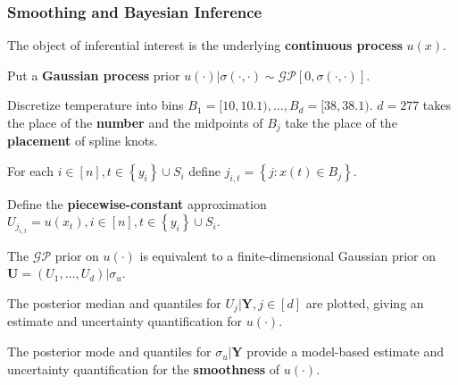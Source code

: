 \documentclass[10pt,usenames,dvipsnames,t]{beamer}
\newcommand{\GP}{\mathcal{GP}}
\newcommand{\bracevec}[1]{\left\lbrace #1 \right\rbrace}
\newcommand{\mb}[1]{\boldsymbol{#1}}
\begin{document}
\begin{frame}
\frametitle{Smoothing and Bayesian Inference \citep{stringercc}}

The object of inferential interest is the underlying \textbf{continuous process} $u(x)$.

\pause

Put a \textbf{Gaussian process} prior $u(\cdot)|\sigma(\cdot,\cdot)\sim\GP\left[ 0,\sigma(\cdot,\cdot)\right]$.

\pause

Discretize temperature into bins $B_{1} = [10,10.1),\ldots,B_{d} = [38,38.1)$. $d = 277$ takes the place of the \textbf{number} and the midpoints of $B_{j}$ take the place of the \textbf{placement} of spline knots.

\pause

For each $i\in[n],t\in\bracevec{y_{i}}\cup S_{i}$ define $j_{i,t} = \bracevec{j: x(t)\in B_{j}}$.

\pause

Define the \textbf{piecewise-constant} approximation $U_{j_{i,t}} = u(x_{t}), i\in[n],t\in\bracevec{y_{i}}\cup S_{i}$.

\pause

The $\GP$ prior on $u(\cdot)$ is equivalent to a finite-dimensional Gaussian prior on $\mb{U} = (U_{1},\ldots,U_{d})|\sigma_{u}$.

\pause

The posterior median and quantiles for $U_{j}|\mb{Y},j\in[d]$ are plotted, giving an estimate and uncertainty quantification for $u(\cdot)$.

\pause

The posterior mode and quantiles for $\sigma_{u}|\mb{Y}$ provide a model-based estimate and uncertainty quantification for the \textbf{smoothness} of $u(\cdot)$.


\end{frame}
\end{document}
